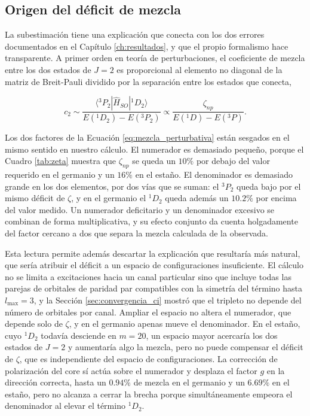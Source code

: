 \subsection{Origen del déficit de mezcla}

La subestimación tiene una explicación que conecta con los dos errores documentados en el Capítulo \ref{ch:resultados}, y que el propio formalismo hace transparente. A primer orden en teoría de perturbaciones, el coeficiente de mezcla entre los dos estados de $J=2$ es proporcional al elemento no diagonal de la matriz de Breit-Pauli dividido por la separación entre los estados que conecta,

\begin{equation}
    \label{eq:mezcla_perturbativa}
    c_2 \sim \frac{\langle {}^3P_2 | \hat{H}_{SO} | {}^1D_2 \rangle}{E(^1D_2) - E(^3P_2)} \propto \frac{\zeta_{np}}{E(^1D) - E(^3P)} .
\end{equation}

Los dos factores de la Ecuación \eqref{eq:mezcla_perturbativa} están sesgados en el mismo sentido en nuestro cálculo. El numerador es demasiado pequeño, porque el Cuadro \ref{tab:zeta} muestra que $\zeta_{np}$ se queda un $10\%$ por debajo del valor requerido en el germanio y un $16\%$ en el estaño. El denominador es demasiado grande en los dos elementos, por dos vías que se suman: el $^3P_2$ queda bajo por el mismo déficit de $\zeta$, y en el germanio el $^1D_2$ queda además un $10.2\%$ por encima del valor medido. Un numerador deficitario y un denominador excesivo se combinan de forma multiplicativa, y su efecto conjunto da cuenta holgadamente del factor cercano a dos que separa la mezcla calculada de la observada.

Esta lectura permite además descartar la explicación que resultaría más natural, que sería atribuir el déficit a un espacio de configuraciones insuficiente. El cálculo no se limita a excitaciones hacia un canal particular sino que incluye todas las parejas de orbitales de paridad par compatibles con la simetría del término hasta $l_{\max}=3$, y la Sección \ref{sec:convergencia_ci} mostró que el tripleto no depende del número de orbitales por canal. Ampliar el espacio no altera el numerador, que depende solo de $\zeta$, y en el germanio apenas mueve el denominador. En el estaño, cuyo $^1D_2$ todavía desciende en $m=20$, un espacio mayor acercaría los dos estados de $J=2$ y aumentaría algo la mezcla, pero no puede compensar el déficit de $\zeta$, que es independiente del espacio de configuraciones. La corrección de polarización del core sí actúa sobre el numerador y desplaza el factor $g$ en la dirección correcta, hasta un $0.94\%$ de mezcla en el germanio y un $6.69\%$ en el estaño, pero no alcanza a cerrar la brecha porque simultáneamente empeora el denominador al elevar el término $^1D_2$.

